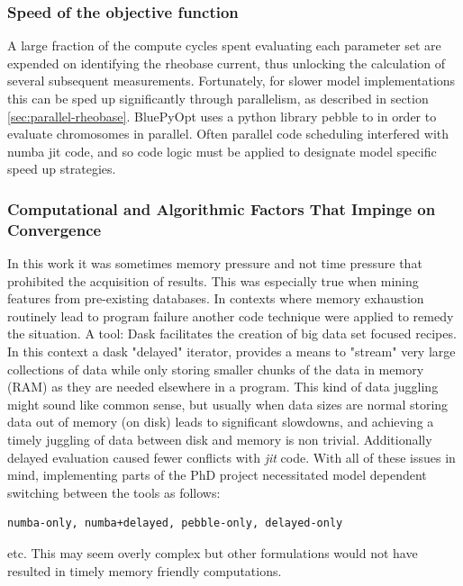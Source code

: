 \subsubsection{Speed of the objective function}
A large fraction of the compute cycles spent evaluating each parameter set are expended on identifying the rheobase current, thus unlocking the calculation of several subsequent measurements.
Fortunately, for slower model implementations this can be sped up significantly through parallelism, as described in section \ref{sec:parallel-rheobase}. BluePyOpt uses a python library pebble to in order to evaluate chromosomes in parallel. Often parallel code scheduling interfered with numba jit code, and so code logic must be applied to designate model specific speed up strategies. 

\subsubsection{Computational and Algorithmic Factors That Impinge on Convergence}


In this work it was sometimes memory pressure and not time pressure that prohibited the acquisition of results. This was especially true when mining features from pre-existing databases. In contexts where memory exhaustion routinely lead to program failure another code technique were applied to remedy the situation. A tool: Dask \cite{rocklin2015dask} facilitates the creation of big data set focused recipes. In this context a dask "delayed" iterator, provides a means to "stream" very large collections of data while only storing smaller chunks of the data in memory (RAM) as they are needed elsewhere in a program. This kind of data juggling might sound like common sense, but usually when data sizes are normal storing data out of memory (on disk) leads to significant slowdowns, and achieving a timely juggling of data between disk and memory is non trivial. %
Additionally delayed evaluation caused fewer conflicts with \emph{jit} code. With all of these issues in mind, implementing parts of the PhD project necessitated model dependent switching between the tools as follows: 
\begin{verbatim}numba-only, numba+delayed, pebble-only, delayed-only\end{verbatim} etc. This may seem overly complex but other formulations would not have resulted in timely memory friendly computations.


